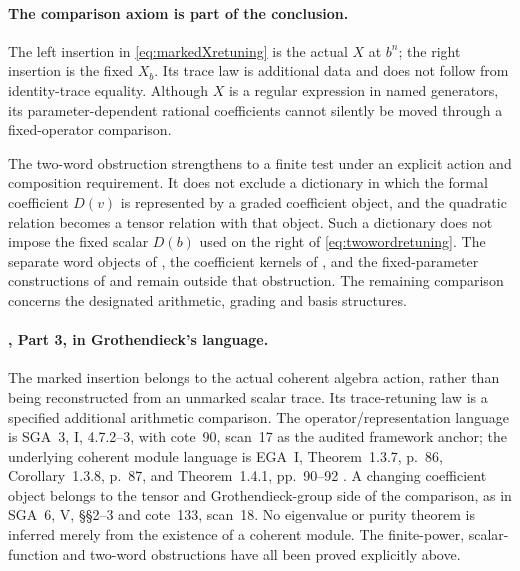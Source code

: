 \paragraph{The comparison axiom is part of the conclusion.}
The left insertion in \eqref{eq:markedXretuning} is the
actual $X$ at $b^n$; the right insertion is the fixed
$X_b$.
Its trace law is additional data and does not follow
from identity-trace equality.
Although $X$ is a regular expression in named generators,
its parameter-dependent rational coefficients cannot
silently be moved through a fixed-operator comparison.

The two-word obstruction strengthens  to a
finite test under an explicit action and composition
requirement.
It does not exclude a dictionary in which the formal
coefficient $D(v)$ is represented by a graded coefficient
object, and the quadratic relation becomes a tensor
relation with that object.
Such a dictionary does not impose the fixed scalar
$D(b)$ used on the right of \eqref{eq:twowordretuning}.
The separate word objects of , the coefficient
kernels of , and the fixed-parameter constructions
of  and  remain outside that obstruction.
The remaining comparison concerns the designated
arithmetic, grading and basis structures.

\paragraph{, Part 3, in Grothendieck's language.}
The marked insertion belongs to the actual coherent
algebra action, rather than being reconstructed from an
unmarked scalar trace.
Its trace-retuning law is a specified additional
arithmetic comparison.
The operator/representation language is SGA~3, I,
4.7.2--3, with cote~90, scan~17 as the audited framework
anchor; the underlying coherent module language is
EGA~I, Theorem~1.3.7, p.~86, Corollary~1.3.8, p.~87,
and Theorem~1.4.1, pp.~90--92
\cite{SGA3,EGA,Archive}.
A changing coefficient object belongs to the tensor
and Grothendieck-group side of the comparison, as in
SGA~6, V, \S\S2--3 and cote~133, scan~18.
No eigenvalue or purity theorem is inferred merely
from the existence of a coherent module.
The finite-power, scalar-function and two-word
obstructions have all been proved explicitly above.

